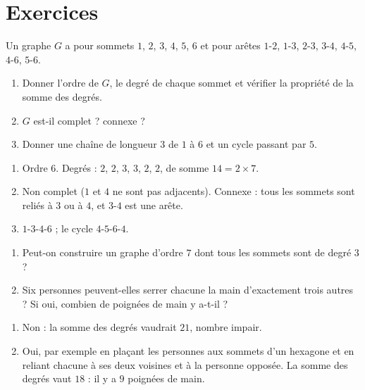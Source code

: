 \section{Exercices}
\begin{exercise}[Vocabulaire]
Un graphe $G$ a pour sommets $1$, $2$, $3$, $4$, $5$, $6$ et pour arêtes $1$-$2$, $1$-$3$, $2$-$3$, $3$-$4$, $4$-$5$, $4$-$6$, $5$-$6$.
\begin{enumerate}
\item Donner l'ordre de $G$, le degré de chaque sommet et vérifier la propriété de la somme des degrés.
\item $G$ est-il complet ? connexe ?
\item Donner une chaîne de longueur $3$ de $1$ à $6$ et un cycle passant par $5$.
\end{enumerate}
\end{exercise}
\begin{solution}
\begin{enumerate}
\item Ordre $6$. Degrés : $2$, $2$, $3$, $3$, $2$, $2$, de somme $14=2\times7$.
\item Non complet ($1$ et $4$ ne sont pas adjacents). Connexe : tous les sommets sont reliés à $3$ ou à $4$, et $3$-$4$ est une arête.
\item $1$-$3$-$4$-$6$ ; le cycle $4$-$5$-$6$-$4$.
\end{enumerate}
\end{solution}

\begin{exercise}
\begin{enumerate}
\item Peut-on construire un graphe d'ordre $7$ dont tous les sommets sont de degré $3$ ?
\item Six personnes peuvent-elles serrer chacune la main d'exactement trois autres ? Si oui, combien de poignées de main y a-t-il ?
\end{enumerate}
\end{exercise}
\begin{solution}
\begin{enumerate}
\item Non : la somme des degrés vaudrait $21$, nombre impair.
\item Oui, par exemple en plaçant les personnes aux sommets d'un hexagone et en reliant chacune à ses deux voisines et à la personne opposée. La somme des degrés vaut $18$ : il y a $9$ poignées de main.
\end{enumerate}
\end{solution}

